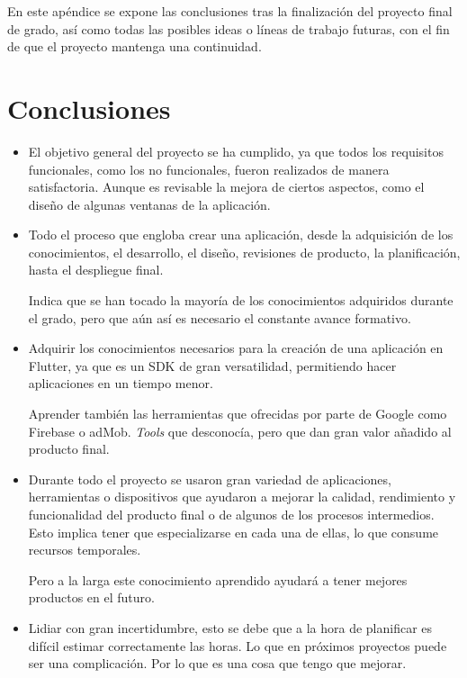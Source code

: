 
En este apéndice se expone las conclusiones tras la finalización del proyecto final de grado, así como todas las posibles ideas o líneas de trabajo futuras, con el fin de que el proyecto mantenga una continuidad.

\section{Conclusiones}

\begin{itemize}
	\item El objetivo general del proyecto se ha cumplido, ya que todos los requisitos funcionales, como los no funcionales, fueron realizados de manera satisfactoria. Aunque es revisable la mejora de ciertos aspectos, como el diseño de algunas ventanas de la aplicación.
		
	\item Todo el proceso que engloba crear una aplicación, desde la adquisición de los conocimientos, el desarrollo, el diseño, revisiones de producto, la planificación, hasta el despliegue final. 
	
	Indica que se han tocado la mayoría de los conocimientos adquiridos durante el grado, pero que aún así es necesario el constante avance formativo.
	
	\item Adquirir los conocimientos necesarios para la creación de una aplicación en Flutter, ya que es un SDK de gran versatilidad, permitiendo hacer aplicaciones en un tiempo menor.
	
	 Aprender también las herramientas que ofrecidas por parte de Google como Firebase o adMob. \emph{Tools} que desconocía, pero que dan gran valor añadido al producto final.
	
	\item Durante todo el proyecto se usaron gran variedad de aplicaciones, herramientas o dispositivos que ayudaron a mejorar la calidad, rendimiento y funcionalidad del producto final o de algunos de los procesos intermedios. Esto implica tener que especializarse en cada una de ellas, lo que consume recursos temporales.
	
	Pero a la larga este conocimiento aprendido ayudará a tener mejores productos en el futuro.
	
	\item Lidiar con gran incertidumbre, esto se debe que a la hora de planificar es difícil estimar correctamente las horas. Lo que en próximos proyectos puede ser una complicación. Por lo que es una cosa que tengo que mejorar.
	

\end{itemize}
